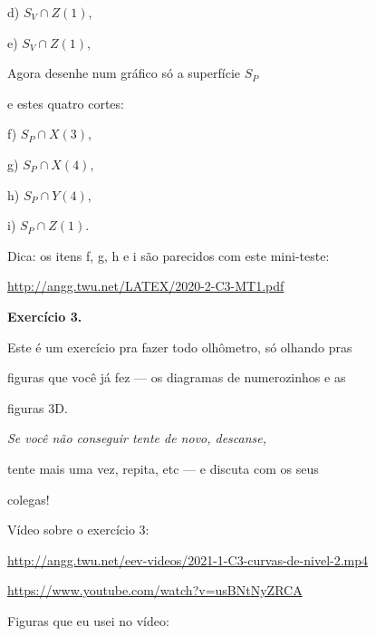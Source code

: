 \documentclass[oneside,12pt]{article}
\begin{document}
d) $S_V∩Z(1)$,

e) $S_V∩Z(1)$,

\msk

Agora desenhe num gráfico só a superfície $S_P$

e estes quatro cortes:

f) $S_P∩X(3)$,

g) $S_P∩X(4)$,

h) $S_P∩Y(4)$,

i) $S_P∩Z(1)$.

\msk

Dica: os itens f, g, h e i são parecidos com este mini-teste:

{\footnotesize


\url{http://angg.twu.net/LATEX/2020-2-C3-MT1.pdf}

}



\newpage


{\bf Exercício 3.}

Este é um exercício pra fazer todo olhômetro, só olhando pras

figuras que você já fez --- os diagramas de numerozinhos e as

figuras 3D. {\sl Se você não conseguir tente de novo, descanse,

tente mais uma vez, repita, etc --- e discuta com os seus

colegas!}

\bsk

Vídeo sobre o exercício 3:

{\footnotesize

\url{http://angg.twu.net/eev-videos/2021-1-C3-curvas-de-nivel-2.mp4}

\url{https://www.youtube.com/watch?v=usBNtNyZRCA}

}

\msk

Figuras que eu usei no vídeo:
\end{document}
